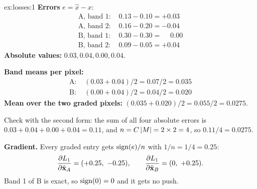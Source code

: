 
\begin{solution}{ex:losses:1}
\textbf{Errors} $e = \hat{x} - x$:
\begin{align*}
\text{A, band 1: } & 0.13 - 0.10 = +0.03\\
\text{A, band 2: } & 0.16 - 0.20 = -0.04\\
\text{B, band 1: } & 0.30 - 0.30 = \phantom{+}0.00\\
\text{B, band 2: } & 0.09 - 0.05 = +0.04
\end{align*}
\textbf{Absolute values:} $0.03, 0.04, 0.00, 0.04$.

\textbf{Band means per pixel:}
\begin{align*}
\text{A: } & (0.03 + 0.04)/2 = 0.07/2 = 0.035\\
\text{B: } & (0.00 + 0.04)/2 = 0.04/2 = 0.020
\end{align*}
\textbf{Mean over the two graded pixels:} $(0.035 + 0.020)/2 = 0.055/2 = 0.0275$.

Check with the second form: the sum of all four absolute errors is $0.03 + 0.04 + 0.00 + 0.04 =
0.11$, and $n = C\left\lvert M \right\rvert = 2 \times 2 = 4$, so $0.11/4 = 0.0275$.

\textbf{Gradient.} Every graded entry gets $\operatorname{sign}(e)/n$ with $1/n = 1/4 = 0.25$:
\[
\frac{\partial L_1}{\partial \hat{\mathbf{x}}_A} = (+0.25,\ -0.25), \qquad
\frac{\partial L_1}{\partial \hat{\mathbf{x}}_B} = (0,\ +0.25).
\]
Band 1 of B is exact, so $\operatorname{sign}(0) = 0$ and it gets no push.
\end{solution}

